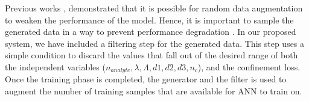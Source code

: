 \documentclass[journal]{IEEEtran}
\begin{document}
Previous works \cite{ravuri2019seeing, shmelkov2018good}, demonstrated that it is possible for random data augmentation to weaken the performance of the model. Hence, it is important to sample the generated data in a way to prevent performance degradation  \cite{bhattarai2019sampling}. In our proposed system, we have included a filtering step for the generated data. This step uses a simple condition to discard the values that fall out of the desired range of both the independent variables  ($n_{analyte}, \lambda, \Lambda, d1, d2, d3, n_c$), and the confinement loss. Once the training phase is completed, the generator and the filter is used to augment the number of training samples that are available for ANN to train on.
%
%	
\end{document}
